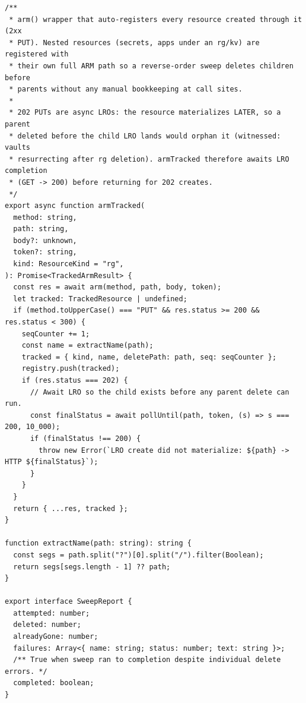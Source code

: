 \documentclass[10pt,twoside,openany]{book}
\theoremstyle{plain}
\theoremstyle{definition}
\theoremstyle{remark}
\begin{document}
\begin{lstlisting}[caption={apps/web/test/harness/lib/residue.ts}]
/**
 * arm() wrapper that auto-registers every resource created through it (2xx
 * PUT). Nested resources (secrets, apps under an rg/kv) are registered with
 * their own full ARM path so a reverse-order sweep deletes children before
 * parents without any manual bookkeeping at call sites.
 *
 * 202 PUTs are async LROs: the resource materializes LATER, so a parent
 * deleted before the child LRO lands would orphan it (witnessed: vaults
 * resurrecting after rg deletion). armTracked therefore awaits LRO completion
 * (GET -> 200) before returning for 202 creates.
 */
export async function armTracked(
  method: string,
  path: string,
  body?: unknown,
  token?: string,
  kind: ResourceKind = "rg",
): Promise<TrackedArmResult> {
  const res = await arm(method, path, body, token);
  let tracked: TrackedResource | undefined;
  if (method.toUpperCase() === "PUT" && res.status >= 200 && res.status < 300) {
    seqCounter += 1;
    const name = extractName(path);
    tracked = { kind, name, deletePath: path, seq: seqCounter };
    registry.push(tracked);
    if (res.status === 202) {
      // Await LRO so the child exists before any parent delete can run.
      const finalStatus = await pollUntil(path, token, (s) => s === 200, 10_000);
      if (finalStatus !== 200) {
        throw new Error(`LRO create did not materialize: ${path} -> HTTP ${finalStatus}`);
      }
    }
  }
  return { ...res, tracked };
}

function extractName(path: string): string {
  const segs = path.split("?")[0].split("/").filter(Boolean);
  return segs[segs.length - 1] ?? path;
}

export interface SweepReport {
  attempted: number;
  deleted: number;
  alreadyGone: number;
  failures: Array<{ name: string; status: number; text: string }>;
  /** True when sweep ran to completion despite individual delete errors. */
  completed: boolean;
}


\end{lstlisting}
\end{document}
